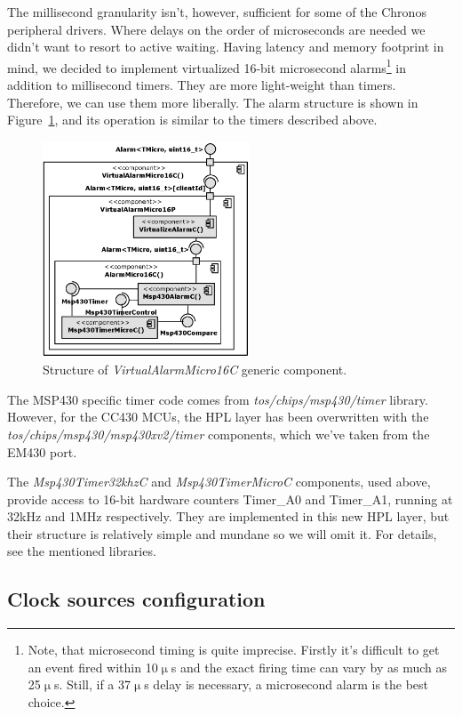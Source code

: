 The millisecond granularity isn't, however, sufficient for some of the Chronos peripheral drivers. Where delays on the order of microseconds are needed we didn't want to resort to active waiting. Having latency and memory footprint in mind, we decided to implement virtualized 16-bit microsecond alarms\footnote{Note, that microsecond timing is quite imprecise. Firstly it's difficult to get an event fired within 10$\upmu$s and the exact firing time can vary by as much as 25$\upmu$s. Still, if a 37$\upmu$s delay is necessary, a microsecond alarm is the best choice.} in addition to millisecond timers. They are more light-weight than timers. Therefore, we can use them more liberally. The alarm structure is shown in Figure~\ref{fig:virutal_alarm_micro_16_c}, and its operation is similar to the timers described above.
\begin{figure}[h]
  \centering
  \includegraphics[width=0.55\textwidth]{diagrams/virutal_alarm_micro_16_c.eps}
  \caption{Structure of \emph{VirtualAlarmMicro16C} generic component.}
  \label{fig:virutal_alarm_micro_16_c}
\end{figure}

The MSP430 specific timer code comes from \emph{tos/chips/msp430/timer} library. However, for the CC430 MCUs, the HPL layer has been overwritten with the \emph{tos/chips/msp430/msp430xv2/timer} components, which we've taken from the EM430 port.

The \emph{Msp430Timer32khzC} and  \emph{Msp430TimerMicroC} components, used above, provide access to 16-bit hardware counters Timer\_A0 and Timer\_A1, running at 32kHz and 1MHz respectively. They are implemented in this new HPL layer, but their structure is relatively simple and mundane so we will omit it. For details, see the mentioned libraries.

\subsection {Clock sources configuration}

